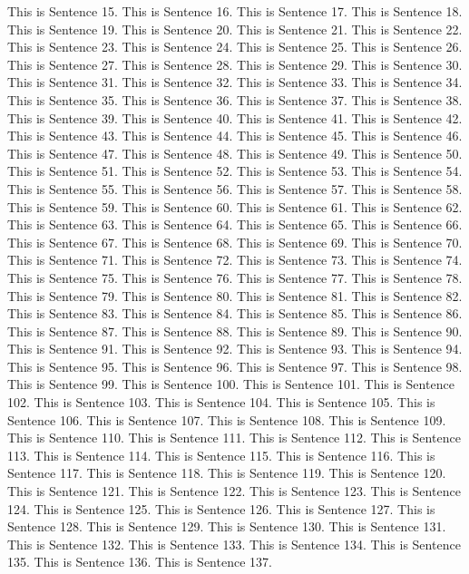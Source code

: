 \documentclass{article}
\begin{document}
This is Sentence 15.
This is Sentence 16.
This is Sentence 17.
This is Sentence 18.
This is Sentence 19.
This is Sentence 20.
This is Sentence 21.
This is Sentence 22.
This is Sentence 23.
This is Sentence 24.
This is Sentence 25.
This is Sentence 26.
This is Sentence 27.
This is Sentence 28.
This is Sentence 29.
This is Sentence 30.
This is Sentence 31.
This is Sentence 32.
This is Sentence 33.
This is Sentence 34.
This is Sentence 35.
This is Sentence 36.
This is Sentence 37.
This is Sentence 38.
This is Sentence 39.
This is Sentence 40.
This is Sentence 41.
This is Sentence 42.
This is Sentence 43.
This is Sentence 44.
This is Sentence 45.
This is Sentence 46.
This is Sentence 47.
This is Sentence 48.
This is Sentence 49.
This is Sentence 50.
This is Sentence 51.
This is Sentence 52.
This is Sentence 53.
This is Sentence 54.
This is Sentence 55.
This is Sentence 56.
This is Sentence 57.
This is Sentence 58.
This is Sentence 59.
This is Sentence 60.
This is Sentence 61.
This is Sentence 62.
This is Sentence 63.
This is Sentence 64.
This is Sentence 65.
This is Sentence 66.
This is Sentence 67.
This is Sentence 68.
This is Sentence 69.
This is Sentence 70.
This is Sentence 71.
This is Sentence 72.
This is Sentence 73.
This is Sentence 74.
This is Sentence 75.
This is Sentence 76.
This is Sentence 77.
This is Sentence 78.
This is Sentence 79.
This is Sentence 80.
This is Sentence 81.
This is Sentence 82.
This is Sentence 83.
This is Sentence 84.
This is Sentence 85.
This is Sentence 86.
This is Sentence 87.
This is Sentence 88.
This is Sentence 89.
This is Sentence 90.
This is Sentence 91.
This is Sentence 92.
This is Sentence 93.
This is Sentence 94.
This is Sentence 95.
This is Sentence 96.
This is Sentence 97.
This is Sentence 98.
This is Sentence 99.
This is Sentence 100.
This is Sentence 101.
This is Sentence 102.
This is Sentence 103.
This is Sentence 104.
This is Sentence 105.
This is Sentence 106.
This is Sentence 107.
This is Sentence 108.
This is Sentence 109.
This is Sentence 110.
This is Sentence 111.
This is Sentence 112.
This is Sentence 113.
This is Sentence 114.
This is Sentence 115.
This is Sentence 116.
This is Sentence 117.
This is Sentence 118.
This is Sentence 119.
This is Sentence 120.
This is Sentence 121.
This is Sentence 122.
This is Sentence 123.
This is Sentence 124.
This is Sentence 125.
This is Sentence 126.
This is Sentence 127.
This is Sentence 128.
This is Sentence 129.
This is Sentence 130.
This is Sentence 131.
This is Sentence 132.
This is Sentence 133.
This is Sentence 134.
This is Sentence 135.
This is Sentence 136.
This is Sentence 137.
\end{document}
